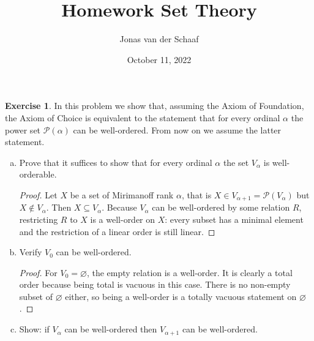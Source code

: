 \documentclass{article}
\title{Homework Set Theory}
\date{October 11, 2022}
\author{Jonas van der Schaaf}
\theoremstyle{definition}
\newtheorem{question}{Exercise}
\newcommand{\powset}{\mathcal{P}}
\begin{document}
\maketitle

\begin{question}
    In this problem we show that, assuming the Axiom of Foundation, the Axiom of
    Choice is equivalent to the statement that for every ordinal \(\alpha\) the
    power set \(\powset(\alpha)\) can be well-ordered. From now on we assume the
    latter statement.
    \begin{enumerate}[a.]
        \item Prove that it suffices to show that for every ordinal \(\alpha\)
              the set \(V_{\alpha}\) is well-orderable.

              \begin{proof}
                  Let \(X\) be a set of Mirimanoff rank \(\alpha\), that is
                  \(X\in V_{\alpha+1}=\powset(V_{\alpha})\) but \(X\notin
                  V_{\alpha}\). Then \(X\subseteq V_{\alpha}\). Because
                  \(V_{\alpha}\) can be well-ordered by some relation \(R\),
                  restricting \(R\) to \(X\) is a well-order on \(X\): every
                  subset has a minimal element and the restriction of a linear
                  order is still linear.
              \end{proof}

        \item Verify \(V_{0}\) can be well-ordered.

              \begin{proof}
                  For \(V_{0}=\varnothing\), the empty relation is a well-order.
                  It is clearly a total order because being total is vacuous in
                  this case. There is no non-empty subset of \(\varnothing\)
                  either, so being a well-order is a totally vacuous statement
                  on \(\varnothing\).
              \end{proof}

        \item Show: if \(V_{\alpha}\) can be well-ordered then \(V_{\alpha+1}\)
              can be well-ordered.


\end{enumerate}
\end{question}
\end{document}
